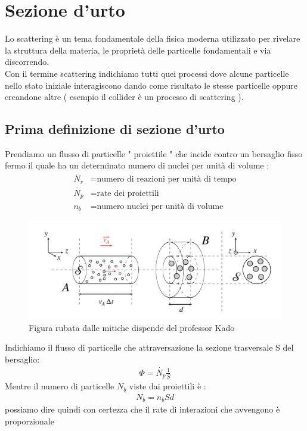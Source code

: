 \chapter{Sezione d'urto}
Lo scattering è un tema fondamentale della fisica moderna utilizzato per rivelare la struttura della
materia, le proprietà delle particelle fondamentali e via discorrendo. \\
Con il termine scattering indichiamo tutti quei processi dove alcune particelle nello stato
iniziale interagiscono dando come risultato le stesse particelle oppure creandone altre
( esempio il collider è un processo di scattering ).
\section{Prima definizione di sezione d'urto}
Prendiamo un flusso di particelle " proiettile " che incide contro un bersaglio fisso fermo
il quale ha un determinato numero di nuclei per unità di volume : 
\begin{align*}
        \dot{N_{r}} &= \text{numero di reazioni per unità di tempo}\\
        \dot{N_{p}} &= \text{rate dei proiettili}\\
        n_{b} &= \text{numero nuclei per unità di volume}
\end{align*}
\begin{figure}[!h]
        \centering
        \includegraphics[scale=0.5]{ch4SezioneUrto/Scattering}
        \caption{Figura rubata dalle mitiche dispende del professor Kado}
\end{figure}
\newpage
Indichiamo il flusso di particelle che attraversazione la sezione trasversale S del bersaglio:
\begin{align*}
    \Phi = \dot{N_{p}}\frac{1}{S}
\end{align*}
Mentre il numero di particelle $N_{b}$ viste dai proiettili è :
\begin{align*}
    N_{b} = n_{b}Sd
\end{align*}
possiamo dire quindi con certezza che il rate di interazioni che avvengono è proporzionale 
